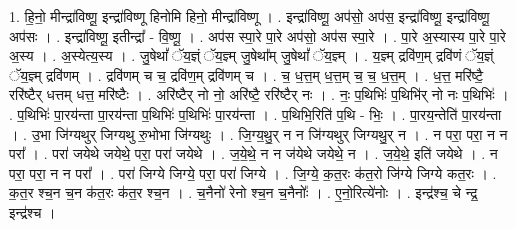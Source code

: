 \documentclass[17pt]{extarticle}
\begin{document}
1. हि॒नो॒ मीन्द्रा॑विष्णू॒ इन्द्रा॑विष्णू हिनोमि हिनो॒ मीन्द्रा॑विष्णू । . इन्द्रा॑विष्णू॒ अप॑सो॒ अप॑स॒ इन्द्रा॑विष्णू॒ इन्द्रा॑विष्णू॒ अप॑सः । . इन्द्रा॑विष्णू॒ इतीन्द्रा᳚ - वि॒ष्णू॒ । . अप॑स स्पा॒रे पा॒रे अप॑सो॒ अप॑स स्पा॒रे । . पा॒रे अ॒स्यास्य पा॒रे पा॒रे अ॒स्य । . अ॒स्येत्य॒स्य । . जु॒षेथां᳚ ॅय॒ज्ञ्ं ॅय॒ज्ञ्म् जु॒षेथा᳚म् जु॒षेथां᳚ ॅय॒ज्ञ्म् । . य॒ज्ञ्म् द्रवि॑ण॒म् द्रवि॑णं ॅय॒ज्ञ्ं ॅय॒ज्ञ्म् द्रवि॑णम् । . द्रवि॑णम् च च॒ द्रवि॑ण॒म् द्रवि॑णम् च । . च॒ ध॒त्त॒म् ध॒त्त॒म् च॒ च॒ ध॒त्त॒म् । . ध॒त्त॒ मरि॑ष्टै॒ ररि॑ष्टैर् धत्तम् धत्त॒ मरि॑ष्टैः । . अरि॑ष्टैर् नो नो॒ अरि॑ष्टै॒ ररि॑ष्टैर् नः । . नः॒ प॒थिभिः॑ प॒थिभि॑र् नो नः प॒थिभिः॑ । . प॒थिभिः॑ पा॒रय॑न्ता पा॒रय॑न्ता प॒थिभिः॑ प॒थिभिः॑ पा॒रय॑न्ता । . प॒थिभि॒रिति॑ प॒थि - भिः॒ । . पा॒रय॒न्तेति॑ पा॒रय॑न्ता । . उ॒भा जि॑ग्यथुर् जिग्यथु रु॒भोभा जि॑ग्यथुः । . जि॒ग्य॒थु॒र् न न जि॑ग्यथुर् जिग्यथु॒र् न । . न परा॒ परा॒ न न परा᳚ । . परा॑ जयेथे जयेथे॒ परा॒ परा॑ जयेथे । . ज॒ये॒थे॒ न न ज॑येथे जयेथे॒ न । . ज॒ये॒थे॒ इति॑ जयेथे । . न परा॒ परा॒ न न परा᳚ । . परा॑ जिग्ये जिग्ये॒ परा॒ परा॑ जिग्ये । . जि॒ग्ये॒ क॒त॒रः क॑त॒रो जि॑ग्ये जिग्ये कत॒रः । . क॒त॒र श्च॒न च॒न क॑त॒रः क॑त॒र श्च॒न । . च॒नैनो॑ रेनो श्च॒न च॒नैनोः᳚ । . ए॒नो॒रित्ये॑नोः । . इन्द्र॑श्च॒ चे न्द्र॒ इन्द्र॑श्च । \newline
\end{document}
